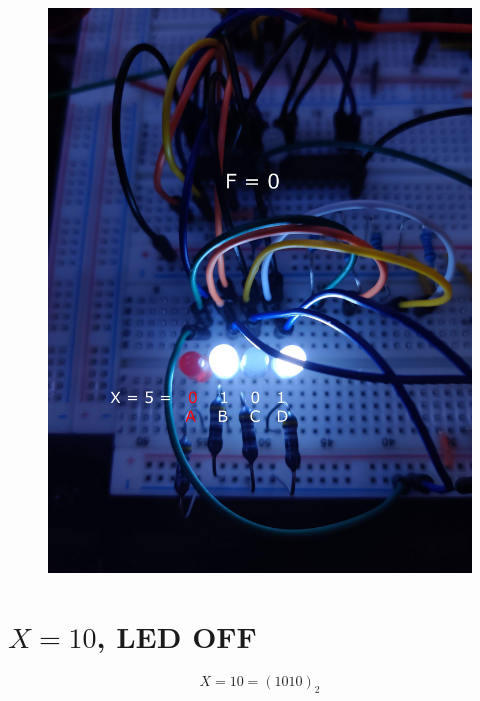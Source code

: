 \documentclass{article}
\begin{document}
\begin{figure}[ht!]
    \centering
    \includegraphics[width=\textwidth]{X_5_0101.jpg}
\end{figure}

\pagebreak

\section{$X=10$, LED OFF}
$$X=10=(1010)_2$$
\end{document}
